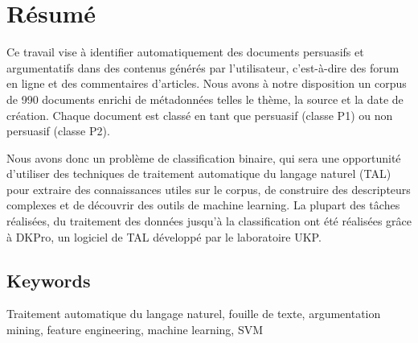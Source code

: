 \newpage
\section*{R\'esum\'e}
Ce travail vise \`a identifier automatiquement des documents persuasifs et argumentatifs dans des contenus g\'en\'er\'es par l'utilisateur, c'est-\`a-dire des forum en ligne et des commentaires d'articles. Nous avons \`a notre disposition un corpus de 990 documents enrichi de m\'etadonn\'ees telles le th\`eme, la source et la date de cr\'eation. Chaque document est class\'e en tant que persuasif (classe P1) ou non persuasif (classe P2).

Nous avons donc un probl\`eme de classification binaire, qui sera une opportunit\'e d'utiliser des techniques de traitement automatique du langage naturel (TAL) pour extraire des connaissances utiles sur le corpus, de construire des descripteurs complexes et de d\'ecouvrir des outils de machine learning. La plupart des t\^aches r\'ealis\'ees, du traitement des donn\'ees jusqu'\`a la classification ont \'et\'e r\'ealis\'ees gr\^ace \`a DKPro, un logiciel de TAL d\'evelopp\'e par le laboratoire UKP.

\subsection*{Keywords}

Traitement automatique du langage naturel, fouille de texte, argumentation mining, feature engineering, machine learning, SVM